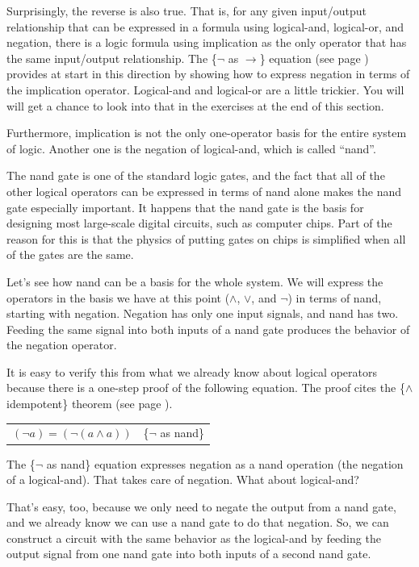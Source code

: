Surprisingly, the reverse is also true.
That is, for any given input/output relationship that can be expressed
in a formula using logical-and, logical-or, and negation,
there is a logic formula using implication as
the only operator that has the same input/output relationship.
The \{$\neg$ as $\rightarrow$\} equation (see page \pageref{neg-as-imp})
provides at start in this direction by showing how to express
negation in terms of the implication operator.
Logical-and and logical-or are a little trickier.
You will will get a chance to look into that in the exercises
at the end of this section.

Furthermore, implication is not the only one-operator
basis for the entire system of logic. Another one
is the negation of logical-and, which is called ``nand''.

The nand gate is one of the standard logic gates,
and the fact that all of the other logical
operators can be expressed in terms of nand alone
makes the nand gate especially important.
It happens that the nand gate is the basis for designing most
large-scale digital circuits, such as computer chips.
Part of the reason for this is that the physics of putting gates on
chips is simplified when all of the gates are the same.

Let's see how nand can be a basis for the whole system.
We will express the operators in the basis we have at
this point ($\wedge$, $\vee$, and $\neg$) in terms of nand,
starting with negation.
Negation has only one input signals, and nand has two.
Feeding the same signal into both
inputs of a nand gate produces the behavior of
the negation operator.

It is easy to verify this from what we already know about logical operators
because there is a one-step proof of the following
equation. The proof cites the \{$\wedge$ idempotent\} theorem
(see page \pageref{and-idempotent}).

\begin{center}
\begin{tabular}{ll}
$(\neg a) = (\neg (a \wedge a))$  & \{$\neg$ as nand\}\label{neg-as-nand}
\end{tabular}
\end{center}

The \{$\neg$ as nand\} equation expresses negation
as a nand operation (the negation of a logical-and).
That takes care of negation. What about logical-and?

That's easy, too, because we only need to negate the
output from a nand gate, and we already know we can
use a nand gate to do that negation.
So, we can construct a circuit with the same behavior
as the logical-and by feeding the output signal
from one nand gate into both inputs of a second nand gate.

